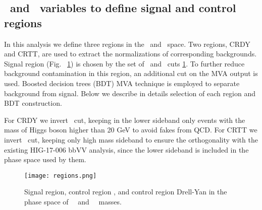 \subsection{\HBB ~and \ZtoLL ~variables to define signal and control regions}

In this analysis we define three regions in the \HBB ~and \ZtoLL
~space. Two regions, CRDY and CRTT, are used to extract the
normalizations of corresponding backgrounds. Signal region (Fig. ~\ref{fig:regions}) is chosen by
the set of \HBB~and \ZtoLL ~cuts \ref{fig:regions}. To further reduce background contamination in this region, an additional cut on the MVA output is used. Boosted decision trees (BDT) MVA technique is employed to
separate background from signal. Below we describe in details
selection of each region and BDT construction. 

For CRDY we invert \HBB ~cut, keeping in the lower sideband only events
with the mass of Higgs boson higher than 20 GeV to avoid fakes from
QCD. For CRTT we invert \ZtoLL ~cut, keeping only high mass sideband to
ensure the orthogonality with the existing HIG-17-006 bbVV analysis, since the lower sideband is included in the phase space used by them. 


\begin{figure}[!htb]%
  \begin{center}
    \texttt{[image: regions.png]}
    \caption{ Signal region, control region \ttbar, and control region Drell-Yan in the phase space of \ZtoLL \ ~and ~\HBB ~masses.    }
    \label{fig:regions}
  \end{center}
\end{figure}


